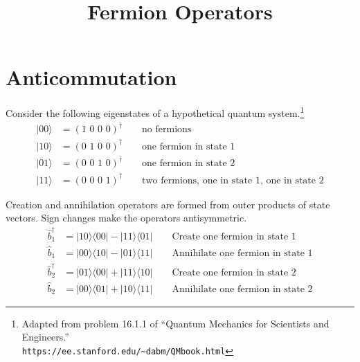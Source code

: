 \documentclass[12pt]{article}
\title{Fermion Operators}
\date{}
\author{}
\begin{document}
\maketitle

\tableofcontents

\newpage

\section{Anticommutation}
Consider the following eigenstates of a hypothetical quantum system.\footnote{
Adapted from problem 16.1.1 of ``Quantum Mechanics for Scientists and Engineers.''\\
{\tt https://ee.stanford.edu/{\textasciitilde}dabm/QMbook.html}}
\begin{align*}
|00\rangle&=(\text{1 0 0 0})^\dag\qquad\text{no fermions}\\
|10\rangle&=(\text{0 1 0 0})^\dag\qquad\text{one fermion in state 1}\\
|01\rangle&=(\text{0 0 1 0})^\dag\qquad\text{one fermion in state 2}\\
|11\rangle&=(\text{0 0 0 1})^\dag\qquad\text{two fermions, one in state 1, one in state 2}
\end{align*}

\noindent
Creation and annihilation operators are formed from outer products of state vectors.
Sign changes make the operators antisymmetric.
\begin{align*}
\hat{b}_1^\dag&=|10\rangle\langle00|-|11\rangle\langle01| \qquad\text{Create one fermion in state 1}
\\
\hat{b}_1&=|00\rangle\langle10|-|01\rangle\langle11| \qquad\text{Annihilate one fermion in state 1}
\\
\hat{b}_2^\dag&=|01\rangle\langle00|+|11\rangle\langle10| \qquad\text{Create one fermion in state 2}
\\
\hat{b}_2&=|00\rangle\langle01|+|10\rangle\langle11| \qquad\text{Annihilate one fermion in state 2}
\end{align*}
\end{document}
